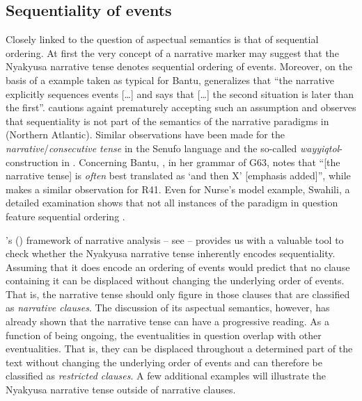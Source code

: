 \subsection{Sequentiality of events}
\label{NARRsequentiality}
Closely linked to the question of aspectual semantics is that of sequential ordering. At first the very concept of a narrative marker may suggest that the Nyakyusa narrative tense denotes sequential ordering of events. Moreover, on the basis of a  example taken as typical for Bantu, \citet[121]{NurseD2008} generalizes that ``the narrative explicitly sequences events [\ldots] and says that [\ldots] the second situation is later than the first''. \citet[111]{CoverR2010} cautions againt prematurely accepting such an assumption and observes that sequentiality is not part of the semantics of the narrative paradigms in  (Northern Atlantic). Similar observations have been made for the \textit{narrative}/\textit{consecutive tense} in the Senufo language  \citep{CarlsonR1994} and the so-called \textit{wayyiqtol}-construction in  \citep{CookJ2004}. Concerning Bantu, \citet[277]{MorrisonME2011}, in her grammar of  G63, notes that ``[the narrative tense] is \textit{often} best translated as \lq and then X' [emphasis added]'', while \citet{SeidelF2015} makes a similar observation for  R41. Even for Nurse's model example, Swahili, a detailed examination shows that not all instances of the paradigm in question feature sequential ordering \citep[112f]{ContiniMoravaE1987}.

\citeauthor{LabovWWaletzkyJ1967}'s (\citeyear{LabovWWaletzkyJ1967}) framework of narrative analysis -- see  -- provides us with a valuable tool to check whether the Nyakyusa narrative tense inherently encodes sequentiality. Assuming that it does encode an ordering of events would predict that no clause containing it can be displaced without changing the underlying order of events. That is, the narrative tense should only figure in those clauses that are classified as \textit{narrative clauses}. The discussion of its aspectual semantics, however, has already shown that the narrative tense can have a progressive reading. As a function of being ongoing, the eventualities in question overlap with other eventualities. That is, they can be displaced throughout a determined part of the text without changing the underlying order of events and can therefore be classified as \textit{restricted clauses}. A few additional examples will illustrate the Nyakyusa narrative tense outside of narrative clauses.

